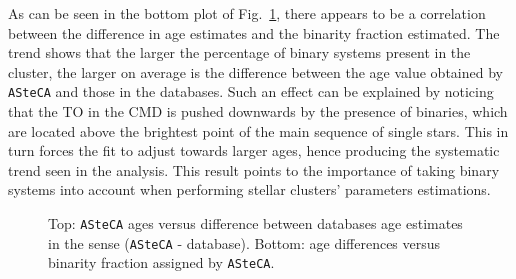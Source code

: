 \documentclass[draft]{aa}
\begin{document}
  As can be seen in the bottom plot of Fig.~\ref{fig:ages}, there appears to be
  a correlation between the difference in age estimates and the binarity
  fraction estimated. The trend shows that the larger the percentage of binary
  systems present in the cluster, the larger on average is the difference
  between the age value obtained by \texttt{ASteCA} and those in the
  databases. Such an effect can be explained by noticing that the TO in the CMD
  is pushed downwards by the presence of binaries, which are located above the
  brightest point of the main sequence of single stars. This in turn forces the
  fit to adjust towards larger ages, hence producing the systematic trend
  seen in the analysis. This result points to the importance of taking binary
  systems into account when performing stellar clusters' parameters estimations.
  \\


  \begin{figure}
   \caption{Top: \texttt{ASteCA} ages versus difference between databases age
   estimates in the sense (\texttt{ASteCA} - database).
   Bottom: age differences versus binarity fraction assigned by
   \texttt{ASteCA}.}
   \label{fig:ages}
  \end{figure}
\end{document}
